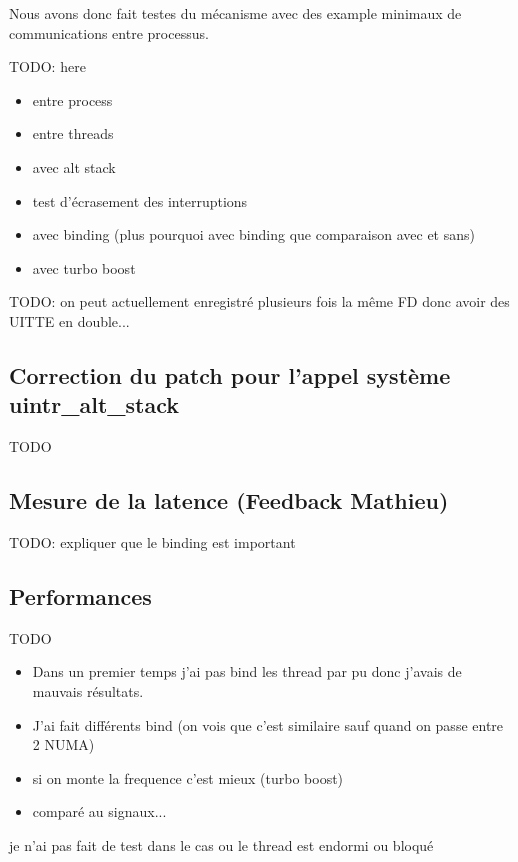 Nous avons donc fait testes du mécanisme avec des example minimaux de communications entre processus.

TODO: here

\begin{itemize}
  \item entre process
  \item entre threads
  \item avec alt stack
  \item test d'écrasement des interruptions
  \item avec binding (plus pourquoi avec binding que comparaison avec et sans)
  \item avec turbo boost
\end{itemize}

TODO: on peut actuellement enregistré plusieurs fois la même FD donc avoir des UITTE en double...

\subsection{Correction du patch pour l'appel système uintr_alt_stack}

TODO

\subsection{Mesure de la latence (Feedback Mathieu)}

TODO: expliquer que le binding est important

\subsection{Performances}

TODO

\begin{itemize}
  \item Dans un premier temps j'ai pas bind les thread par pu donc j'avais de mauvais résultats.
  \item J'ai fait différents bind (on vois que c'est similaire sauf quand on passe entre 2 NUMA)
  \item si on monte la frequence c'est mieux (turbo boost)
  \item comparé au signaux...
\end{itemize}

je n'ai pas fait de test dans le cas ou le thread est endormi ou bloqué
